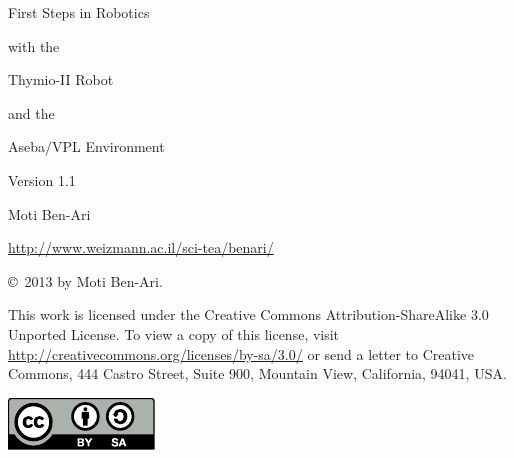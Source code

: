 \thispagestyle{empty}

\begin{center}
\begin{bfseries}
\begin{LARGE}
First Steps in Robotics

with the

Thymio-II Robot

and the

Aseba/VPL Environment

\bigskip

Version 1.1

\bigskip\bigskip\bigskip\bigskip

Moti Ben-Ari

\bigskip
\end{LARGE}

\begin{Large}
\url{http://www.weizmann.ac.il/sci-tea/benari/}
\end{Large}
\end{bfseries}
\end{center}

\vfill

\begin{center}
\copyright{}\  2013 by Moti Ben-Ari. 
\end{center}

This work is licensed under the Creative Commons
Attribution-ShareAlike 3.0 Unported License. To view a copy
of this license, visit
\url{http://creativecommons.org/licenses/by-sa/3.0/}
or send a letter to Creative Commons, 444 Castro Street, Suite 900,
Mountain View, California, 94041, USA.

\begin{center}
\includegraphics[width=.2\textwidth]{../images/by-sa}
\end{center}

\tableofcontents
\thispagestyle{empty}
